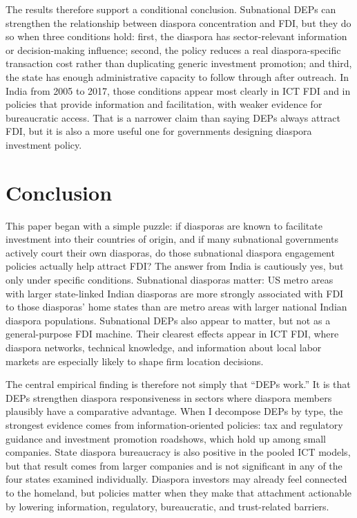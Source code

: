 \documentclass[12pt]{article}
\begin{document}
The results therefore support a conditional conclusion. Subnational DEPs can strengthen the relationship between diaspora concentration and FDI, but they do so when three conditions hold: first, the diaspora has sector-relevant information or decision-making influence; second, the policy reduces a real diaspora-specific transaction cost rather than duplicating generic investment promotion; and third, the state has enough administrative capacity to follow through after outreach. In India from 2005 to 2017, those conditions appear most clearly in ICT FDI and in policies that provide information and facilitation, with weaker evidence for bureaucratic access. That is a narrower claim than saying DEPs always attract FDI, but it is also a more useful one for governments designing diaspora investment policy.

\section{Conclusion} \label{sec:conclusion}

This paper began with a simple puzzle: if diasporas are known to facilitate investment into their countries of origin, and if many subnational governments actively court their own diasporas, do those subnational diaspora engagement policies actually help attract FDI? The answer from India is cautiously yes, but only under specific conditions. Subnational diasporas matter: US metro areas with larger state-linked Indian diasporas are more strongly associated with FDI to those diasporas' home states than are metro areas with larger national Indian diaspora populations. Subnational DEPs also appear to matter, but not as a general-purpose FDI machine. Their clearest effects appear in ICT FDI, where diaspora networks, technical knowledge, and information about local labor markets are especially likely to shape firm location decisions.

The central empirical finding is therefore not simply that ``DEPs work.'' It is that DEPs strengthen diaspora responsiveness in sectors where diaspora members plausibly have a comparative advantage. When I decompose DEPs by type, the strongest evidence comes from information-oriented policies: tax and regulatory guidance and investment promotion roadshows, which hold up among small companies. State diaspora bureaucracy is also positive in the pooled ICT models, but that result comes from larger companies and is not significant in any of the four states examined individually. Diaspora investors may already feel connected to the homeland, but policies matter when they make that attachment actionable by lowering information, regulatory, bureaucratic, and trust-related barriers.
\end{document}
